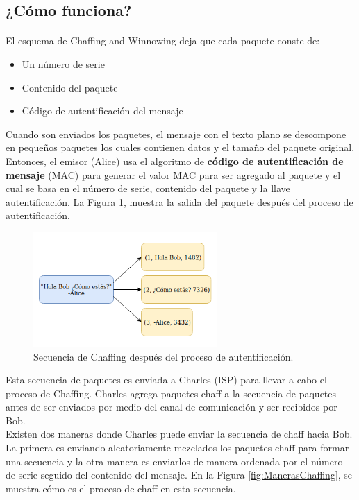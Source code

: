 \documentclass[12pt, a4paper, titlepage]{report}
\begin{document}
		\subsection{¿Cómo funciona?}
		
		\paragraph{}
		El esquema de Chaffing and Winnowing deja que cada paquete conste de: 
		\begin{itemize}
		    \item Un número de serie
		    \item Contenido del paquete
		    \item Código de autentificación del mensaje
		\end{itemize}
		Cuando son enviados los paquetes, el mensaje con el texto plano se descompone en pequeños paquetes los cuales contienen datos y el tamaño del paquete original. Entonces, el emisor (Alice) usa el algoritmo de \textbf{código de autentificación de mensaje} (MAC) para generar el valor MAC para ser agregado al paquete y el cual se basa en el número de serie, contenido del paquete y la llave autentificación. La Figura \ref{fig:ChaffingSalidaPaquetes}, muestra la salida del paquete después del proceso de autentificaci\'on.
		\begin{figure}[H]
			\begin{center}	                  \includegraphics[width=7cm]{./imagenes/MarcoTeorico/descomposicionChaffing.png}
				\caption{Secuencia de Chaffing después del proceso de autentificación.}
				\label{fig:ChaffingSalidaPaquetes}
			\end{center}
		\end{figure}
		Esta secuencia de paquetes es enviada a Charles (ISP) para llevar a cabo el proceso de Chaffing. Charles agrega paquetes chaff a la secuencia de paquetes antes de ser enviados por medio del canal de comunicación y ser recibidos por Bob. \\
		Existen dos maneras donde Charles puede enviar la secuencia de chaff hacia Bob. La primera es enviando aleatoriamente mezclados los paquetes chaff para formar una secuencia y la otra manera es enviarlos de manera ordenada por el n\'umero de serie seguido del contenido del mensaje. En la Figura \ref{fig:ManerasChaffing}, se muestra cómo es el proceso de chaff en esta secuencia.
\end{document}
